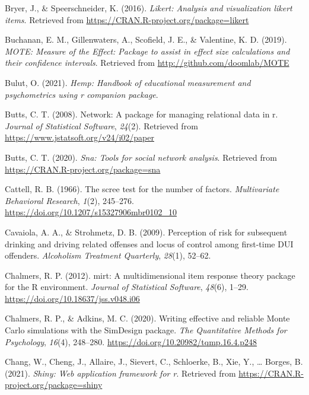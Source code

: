 \documentclass[
  man]{apa6}
\newlength{\cslhangindent}
\newlength{\cslentryspacingunit} %
\newenvironment{CSLReferences}[2] %
 {%
  \setlength{\parindent}{0pt}
  \ifodd #1
  \let\oldpar\par
  \def\par{\hangindent=\cslhangindent\oldpar}
  \fi
  \setlength{\parskip}{#2\cslentryspacingunit}
 }%
 {}
\begin{document}
\begin{CSLReferences}{1}{0}
\leavevmode{}%
Bryer, J., \& Speerschneider, K. (2016). \emph{Likert: Analysis and visualization likert items}. Retrieved from \url{https://CRAN.R-project.org/package=likert}

\leavevmode{}%
Buchanan, E. M., Gillenwaters, A., Scofield, J. E., \& Valentine, K. D. (2019). \emph{{MOTE: Measure of the Effect}: Package to assist in effect size calculations and their confidence intervals}. Retrieved from \url{http://github.com/doomlab/MOTE}

\leavevmode{}%
Bulut, O. (2021). \emph{Hemp: Handbook of educational measurement and psychometrics using r companion package}.

\leavevmode{}%
Butts, C. T. (2008). Network: A package for managing relational data in r. \emph{Journal of Statistical Software}, \emph{24}(2). Retrieved from \url{https://www.jstatsoft.org/v24/i02/paper}

\leavevmode{}%
Butts, C. T. (2020). \emph{Sna: Tools for social network analysis}. Retrieved from \url{https://CRAN.R-project.org/package=sna}

\leavevmode{}%
Cattell, R. B. (1966). The scree test for the number of factors. \emph{Multivariate Behavioral Research}, \emph{1}(2), 245--276. \url{https://doi.org/10.1207/s15327906mbr0102_10}

\leavevmode{}%
Cavaiola, A. A., \& Strohmetz, D. B. (2009). Perception of risk for subsequent drinking and driving related offenses and locus of control among first-time DUI offenders. \emph{Alcoholism Treatment Quarterly}, \emph{28}(1), 52--62.

\leavevmode{}%
Chalmers, R. P. (2012). {mirt}: A multidimensional item response theory package for the {R} environment. \emph{Journal of Statistical Software}, \emph{48}(6), 1--29. \url{https://doi.org/10.18637/jss.v048.i06}

\leavevmode{}%
Chalmers, R. P., \& Adkins, M. C. (2020). Writing effective and reliable {Monte Carlo} simulations with the {SimDesign} package. \emph{The Quantitative Methods for Psychology}, \emph{16}(4), 248--280. \url{https://doi.org/10.20982/tqmp.16.4.p248}

\leavevmode{}%
Chang, W., Cheng, J., Allaire, J., Sievert, C., Schloerke, B., Xie, Y., \ldots{} Borges, B. (2021). \emph{Shiny: Web application framework for r}. Retrieved from \url{https://CRAN.R-project.org/package=shiny}


\end{CSLReferences}
\end{document}
